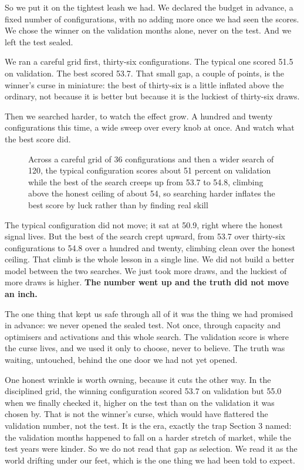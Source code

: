 \documentclass[11pt]{article} %
\begin{document}
So we put it on the tightest leash we had. We declared the budget in advance, a fixed number of configurations, with no adding more once we had seen the scores. We chose the winner on the validation months alone, never on the test. And we left the test sealed.

We ran a careful grid first, thirty-six configurations. The typical one scored 51.5 on validation. The best scored 53.7. That small gap, a couple of points, is the winner's curse in miniature: the best of thirty-six is a little inflated above the ordinary, not because it is better but because it is the luckiest of thirty-six draws.

Then we searched harder, to watch the effect grow. A hundred and twenty configurations this time, a wide sweep over every knob at once. And watch what the best score did.

\begin{figure}[htbp]
\centering

\caption{Across a careful grid of 36 configurations and then a wider search of 120, the typical configuration scores about 51 percent on validation while the best of the search creeps up from 53.7 to 54.8, climbing above the honest ceiling of about 54, so searching harder inflates the best score by luck rather than by finding real skill}
\end{figure}


The typical configuration did not move; it sat at 50.9, right where the honest signal lives. But the best of the search crept upward, from 53.7 over thirty-six configurations to 54.8 over a hundred and twenty, climbing clean over the honest ceiling. That climb is the whole lesson in a single line. We did not build a better model between the two searches. We just took more draws, and the luckiest of more draws is higher. \textbf{The number went up and the truth did not move an inch.}

The one thing that kept us safe through all of it was the thing we had promised in advance: we never opened the sealed test. Not once, through capacity and optimisers and activations and this whole search. The validation score is where the curse lives, and we used it only to choose, never to believe. The truth was waiting, untouched, behind the one door we had not yet opened.

One honest wrinkle is worth owning, because it cuts the other way. In the disciplined grid, the winning configuration scored 53.7 on validation but 55.0 when we finally checked it, higher on the test than on the validation it was chosen by. That is not the winner's curse, which would have flattered the validation number, not the test. It is the era, exactly the trap Section 3 named: the validation months happened to fall on a harder stretch of market, while the test years were kinder. So we do not read that gap as selection. We read it as the world drifting under our feet, which is the one thing we had been told to expect.
\end{document}

